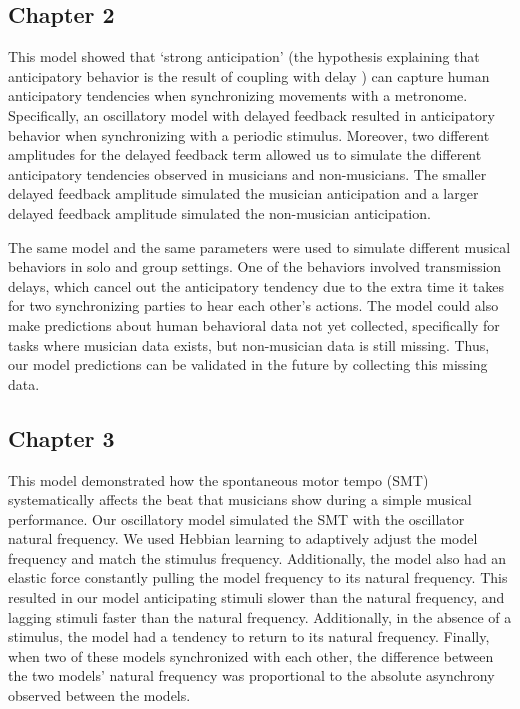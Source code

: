 \documentclass{report}
\begin{document}
\subsection{Chapter 2}
This model showed that `strong anticipation' (the hypothesis explaining that anticipatory behavior is the result of coupling with delay \cite{stepp2010strong}) can capture human anticipatory tendencies when synchronizing movements with a metronome. Specifically, an oscillatory model with delayed feedback resulted in anticipatory behavior when synchronizing with a periodic stimulus. Moreover, two different amplitudes for the delayed feedback term allowed us to simulate the different anticipatory tendencies observed in musicians and non-musicians. The smaller delayed feedback amplitude simulated the musician anticipation and a larger delayed feedback amplitude simulated the non-musician anticipation. 
    
The same model and the same parameters were used to simulate different musical behaviors in solo and group settings. One of the behaviors involved transmission delays, which cancel out the anticipatory tendency due to the extra time it takes for two synchronizing parties to hear each other's actions. The model could also make predictions about human behavioral data not yet collected, specifically for tasks where musician data exists, but non-musician data is still missing. Thus, our model predictions can be validated in the future by collecting this missing data.

\subsection{Chapter 3}
This model demonstrated how the spontaneous motor tempo (SMT) systematically affects the beat that musicians show during a simple musical performance. Our oscillatory model simulated the SMT with the oscillator natural frequency. We used Hebbian learning to adaptively adjust the model frequency and match the stimulus frequency. Additionally, the model also had an elastic force constantly pulling the model frequency to its natural frequency. This resulted in our model anticipating stimuli slower than the natural frequency, and lagging stimuli faster than the natural frequency. Additionally, in the absence of a stimulus, the model had a tendency to return to its natural frequency. Finally, when two of these models synchronized with each other, the difference between the two models' natural frequency was proportional to the absolute asynchrony observed between the models.
\end{document}
